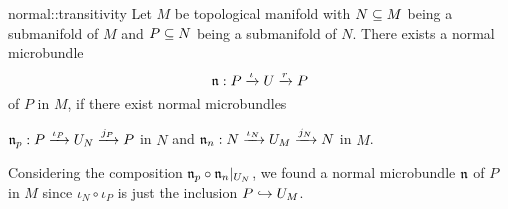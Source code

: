 \begin{mylemma}{normal::transitivity}
    Let $M$ be topological manifold with $N \sub M$
    being a submanifold of $M$ and $P \sub N$ being a submanifold of $N$.
    There exists a normal microbundle
    \[ \bundledef{\bn}{P}{U}{\iota}{r} \]
    of $P$ in $M$, if there exist normal microbundles
    \begin{center}
        $\bundledef{\bn_p}{P}{U_N}{\iota_P}{j_P}$ in $N$ and $\bundledef{\bn_n}{N}{U_M}{\iota_N}{j_N}$ in $M$.
    \end{center}
\end{mylemma}

\begin{myproof}
    Considering the composition $\bn_p \circ \bn_n\restr{U_N}$,
    we found a normal microbundle $\bn$ of $P$ in $M$
    since $\iota_N \circ \iota_P$ is just the inclusion $P \incl U_M$.
\end{myproof}